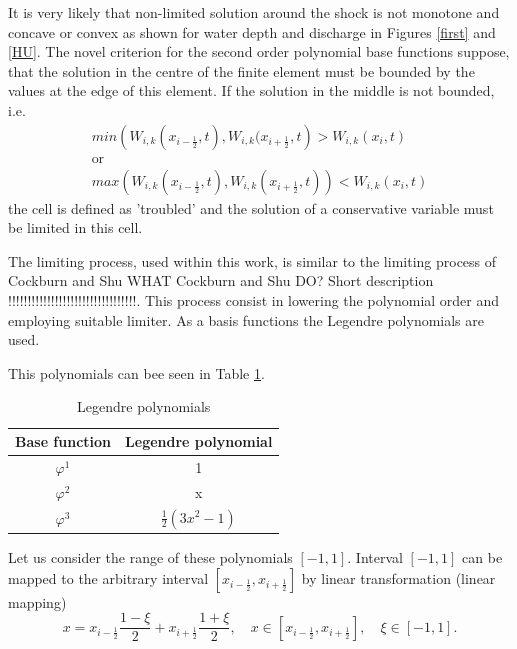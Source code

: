 It is very likely that non-limited solution around the shock is not monotone and concave or convex as shown for water depth and discharge in Figures \ref{first} and \ref{HU}. The novel criterion for the second order polynomial base functions suppose, that the solution in the centre of the finite element must be bounded by the values at the edge of this element. If the solution in the middle is not bounded, i.e.
\begin{equation}\label{crit}
\begin{array}{c}
 min\left(W_{i,k}(x_{i-\frac12},t),W_{i,k}(x_{i+\frac12},t\right)>W_{i,k}(x_i,t)\\
\text{or}\\
 max\left(W_{i,k}(x_{i-\frac12},t),W_{i,k}(x_{i+\frac12},t)\right)< W_{i,k}(x_i,t)
 \end{array}
\end{equation}
the cell is defined as 'troubled' and the solution of a conservative variable must be limited in this cell.

The limiting process, used within this work, is similar to the limiting process of Cockburn and Shu \cite{Cockburn1989b} WHAT  Cockburn and Shu DO? Short description !!!!!!!!!!!!!!!!!!!!!!!!!!!!!!!!!. This process consist in lowering the polynomial order and employing suitable limiter. As a basis functions the Legendre polynomials are used.

 This polynomials can bee seen in Table \ref{table:legendre}.
\begin{table}
\caption{Legendre polynomials}
\centering
\begin{tabular}{|c|c |}
\hline
Base function & Legendre polynomial\\
\hline
\hline
$\varphi^1$ & 1\\
$\varphi^2$ & x\\
$\varphi^3$ & $\frac12\left(3x^2-1\right)$\\
\hline
\end{tabular}
\label{table:legendre}%
\end{table}
Let us consider the range of these polynomials $[-1,1]$. Interval $[-1,1]$ can be mapped to the arbitrary interval $[x_{i-\frac12},x_{i+\frac12}]$ by linear transformation (linear mapping)
\begin{equation}\label{mapping}
x=x_{i-\frac12}\frac{1-\xi}{2}+x_{i+\frac12}\frac{1+\xi}{2}, \quad x\in[x_{i-\frac12},x_{i+\frac12}],
\quad \xi\in[-1,1].
\end{equation}

